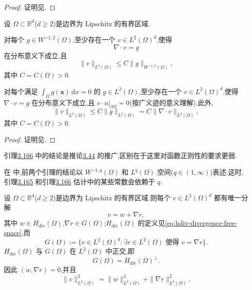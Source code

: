 \begin{proof}
证明见\textcite[第 76 页]{Sohr2001}.
\end{proof}

\begin{lemma}[方程 $\nabla\cdot v=g$ 的解的存在性]\label{lem:divergence-equation-solution}
设 $\Omega\subset\mathbb{R}^d$($d\ge2$)是边界为 Lipschitz 的有界区域.

对每个 $g\in W^{-1,2}(\Omega)$,至少存在一个 $v\in L^2(\Omega)^d$,使得
\[
  \nabla\cdot v=g
\]
在分布意义下成立,且
\[
  \|v\|_{L^2(\Omega)}
    \le C\|g\|_{W^{-1,2}(\Omega)},
\]
其中 $C=C(\Omega)>0$.

对每个满足 $\int_\Omega g(\bm{x})\,\mathrm{d}x=0$ 的 $g\in L^2(\Omega)$,至少存在一个 $v\in L^2(\Omega)^d$,使得 $\nabla\cdot v=g$ 在分布意义下成立,且 $v\cdot n|_{\partial\Omega}=0$(按广义迹的意义理解).此外,
\[
  \|v\|_{L^2(\Omega)}
    \le C\|g\|_{L^2(\Omega)}
    =C\|\nabla\cdot v\|_{L^2(\Omega)},
\]
其中 $C=C(\Omega)>0$.
\end{lemma}

\begin{proof}
证明见\textcite[第 80 页]{Sohr2001}.
\end{proof}

\begin{note}[关于引理 3.166]\label{note:divergence-equation-lemma}
引理\hyperref[lem:divergence-equation-solution]{3.166} 中的结论是推论\hyperref[cor:each-pressure-is-divergence]{3.44} 的推广,区别在于这里对函数正则性的要求更弱.

在\textcite{Sohr2001} 中,前两个引理的结论以 $W^{-1,q}(\Omega)$ 和 $L^q(\Omega)$ 空间($q\in(1,\infty)$)表述.这时,引理\hyperref[lem:distribution-gradient-criterion]{3.165} 和引理\hyperref[lem:divergence-equation-solution]{3.166} 估计中的某些常数会依赖于 $q$.
\end{note}

\begin{theorem}\label{thm:helmholtz-decomposition}
设 $\Omega\subset\mathbb{R}^d$($d\ge2$)是边界为 Lipschitz 的有界区域.则每个 $v\in L^2(\Omega)^d$ 都有唯一分解
\begin{equation}\label{eq:helmholtz-decomposition}
  v=w+\nabla r,
\end{equation}
其中 $w\in H_{\mathrm{div}}(\Omega)$,$\nabla r\in G(\Omega)$;$H_{\mathrm{div}}(\Omega)$ 的定义见\cref{eq:hdiv-divergence-free-space},而
\[
  G(\Omega)
   :=\{v\in L^2(\Omega)^d:
        \exists r\in L^2(\Omega)\text{ 使得 }v=\nabla r\}.
\]
$H_{\mathrm{div}}(\Omega)$ 与 $G(\Omega)$ 在 $L^2(\Omega)$ 中正交,即
\[
  G(\Omega)=H_{\mathrm{div}}(\Omega)^\perp.
\]
因此 $(w,\nabla r)=0$,并且
\begin{equation}\label{eq:helmholtz-pythagorean}
  \|v\|_{L^2(\Omega)}^2
    =\|w\|_{L^2(\Omega)}^2+\|\nabla r\|_{L^2(\Omega)}^2.
\end{equation}
\end{theorem}

